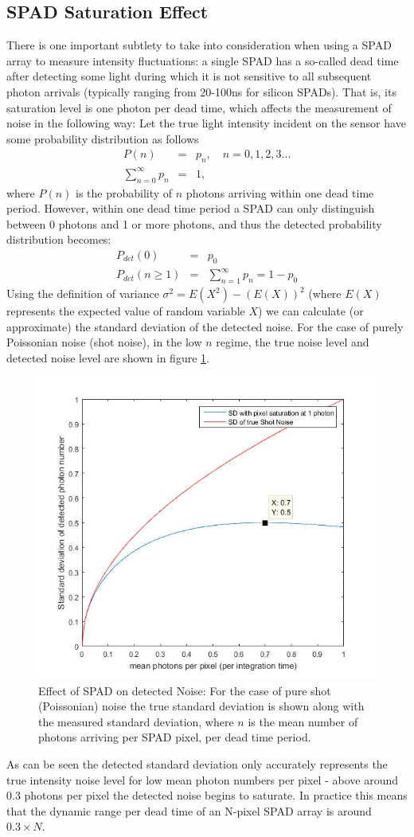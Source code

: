 \documentclass[]{article}
\begin{document}
\subsection{SPAD Saturation Effect}
	There is one important subtlety to take into consideration when using a SPAD array to measure intensity fluctuations: a single SPAD has a so-called dead time after detecting some light during which it is not sensitive to all subsequent photon arrivals (typically ranging from 20-100ns for silicon SPADs). That is, its saturation level is one photon per dead time, which affects the measurement of noise in the following way: Let the true light intensity incident on the sensor have some probability distribution as follows
		\begin{eqnarray}
			P(n) &=& p_n, \quad n = 0,1,2,3... \\
			\sum_{n = 0}^{\infty} p_n &=&1,
		\end{eqnarray}
	where $P(n)$ is the probability of $n$ photons arriving within one dead time period. However, within one dead time period a SPAD can only distinguish between 0 photons and 1 or more photons, and thus the detected probability distribution becomes:
		\begin{eqnarray}
			P_{det} (0) &=& p_0\\
			P_{det} (n \geq 1) &=& \sum_{n = 1}^{\infty} p_n = 1-p_0
		\end{eqnarray}
	Using the definition of variance $\sigma^2 = E(X^2) - (E(X))^2$ (where $E(X)$ represents the expected value of random variable $X$) we can calculate (or approximate) the standard deviation of the detected noise. For the case of purely Poissonian noise (shot noise), in the low $n$ regime, the true noise level and detected noise level are shown in figure \ref{fig:spadsaturationeffect}.
		\begin{figure}[h]
			\centering
			\includegraphics[width=0.5\linewidth]{Figures/SPADsaturationEffect}
			\caption{Effect of SPAD on detected Noise: For the case of pure shot (Poissonian) noise the true standard deviation is shown along with the measured standard deviation, where $n$ is the mean number of photons arriving per SPAD pixel, per dead time period.}
			\label{fig:spadsaturationeffect}
		\end{figure}
	As can be seen the detected standard deviation only accurately represents the true intensity noise level for low mean photon numbers per pixel - above around 0.3 photons per pixel the detected noise begins to saturate. In practice this means that the dynamic range per dead time of an N-pixel SPAD array is around $0.3\times N$. 
	
\end{document}

